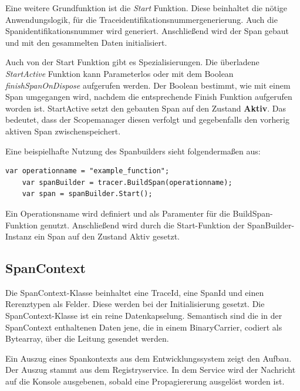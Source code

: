 Eine weitere Grundfunktion ist die \emph{Start} Funktion. Diese beinhaltet die nötige Anwendungslogik, für die Traceidentifikationsnummergenerierung. Auch die Spanidentifikationsnummer wird generiert. Anschließend wird der Span gebaut und mit den gesammelten Daten initialisiert.

Auch von der Start Funktion gibt es Spezialisierungen. Die überladene \emph{StartActive} Funktion kann Parameterlos oder mit dem Boolean \emph{finishSpanOnDispose} aufgerufen werden. Der Boolean bestimmt, wie mit einem Span umgegangen wird, nachdem die entsprechende Finish Funktion aufgerufen worden ist. StartActive setzt den gebauten Span auf den Zustand \textbf{Aktiv}. Das bedeutet, dass der Scopemanager diesen verfolgt und gegebenfalls den vorherig aktiven Span zwischenspeichert.

Eine beispielhafte Nutzung des Spanbuilders sieht folgendermaßen aus:

\begin{minipage}[]{\textwidth}
	\begin{lstlisting}[frame=trBL]
	var operationname = "example_function";
	var spanBuilder = tracer.BuildSpan(operationname);
	var span = spanBuilder.Start();
	\end{lstlisting}
	\label{listing:SpanBuiler}
\end{minipage} 

Ein Operationsname wird definiert und als Paramenter für die BuildSpan-Funktion genutzt. Anschließend wird durch die Start-Funktion der SpanBuilder-Instanz ein Span auf den Zustand Aktiv gesetzt.


\subsection{SpanContext}
\label{subsection:SpanContext}

Die SpanContext-Klasse beinhaltet eine TraceId, eine SpanId und einen Rerenztypen als Felder. Diese werden bei der Initialisierung gesetzt. Die SpanContext-Klasse ist ein reine Datenkapselung. Semantisch sind die in der SpanContext enthaltenen Daten jene, die in einem BinaryCarrier, codiert als Bytearray, über die Leitung gesendet werden.

Ein Auszug eines Spankontexts aus dem Entwicklungssystem zeigt den Aufbau. Der Auszug stammt aus dem Registryservice. In dem Service wird der Nachricht auf die Konsole ausgebenen, sobald eine Propagiererung ausgelöst worden ist.

